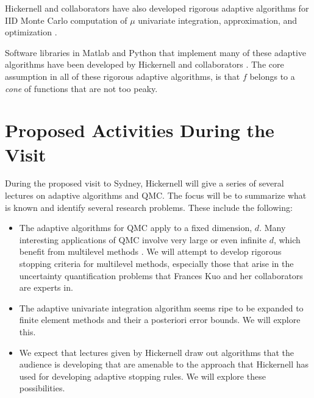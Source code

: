 \documentclass{amsart}
\begin{document}
Hickernell and collaborators have also developed rigorous adaptive algorithms for IID Monte Carlo computation of $\mu$ \cite{HicEtal14a} univariate integration, approximation, and optimization \cite{HicETal14b,ChoEtal17a}.

Software libraries in Matlab and Python that implement many of these adaptive algorithms have been developed by Hickernell and collaborators \cite{ChoEtal21a,QMCPy2020a}.  The core assumption in all of these rigorous adaptive algorithms, is that $f$ belongs to a \emph{cone} of functions that are not too peaky.

\section{Proposed Activities During the Visit}

During the proposed visit to Sydney, Hickernell will give a series of several lectures on adaptive algorithms and QMC.  The focus will be to summarize what is known and identify several research problems.  These include the following:
\begin{itemize}
    \item The adaptive algorithms for QMC apply to a fixed dimension, $d$. Many interesting applications of QMC involve very large or even infinite $d$, which benefit from multilevel methods \cite{Gil14a}.  We will attempt to develop rigorous stopping criteria for multilevel methods, especially those that arise in the uncertainty quantification problems that Frances Kuo and her collaborators are experts in.

    \item The adaptive univariate integration algorithm seems ripe to be expanded to finite element methods and their a posteriori error bounds.  We will explore this.

    \item We expect that lectures given by Hickernell draw out algorithms that the audience is developing that are amenable to the approach that Hickernell has used for developing adaptive stopping rules.  We will explore these possibilities.
\end{itemize}



\end{document}
